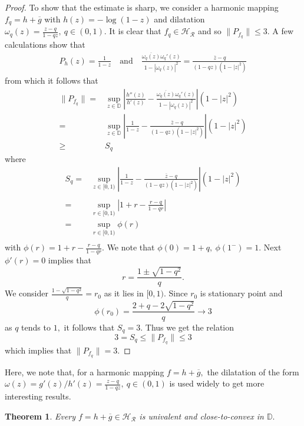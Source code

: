 \documentclass[a4paper,12pt]{amsart}
\newtheorem{thm}{Theorem}[section]
\theoremstyle{definition}
\begin{document}
\begin{proof}
		
		To show that the estimate is sharp, we consider a harmonic mapping $f_q=h+\overline{g}$ with $h(z)=-\log{(1-z)}$ and dilatation $\omega_q(z)=\frac{z-q}{1-qz},~q\in(0,1).$ It is clear that $f_q\in \mathcal{H_R}$ and so $\|P_{f_q}\|\le3.$ A few calculations show that 
		\begin{align}
			P_h(z)=\frac{1}{1-z}\quad\text{and}\quad \frac{\overline{\omega_q(z)}\omega_q'(z)}{1-|\omega_q(z)|^2}=\frac{\overline{z}-q}{(1-qz)(1-|z|^2)}
		\end{align}
		from which it follows that 
		\begin{align}
			\|P_{f_q}\|=&\sup_{z \in \mathbb{D}}\left|\frac{h''(z)}{h'(z)}-\frac{\overline{\omega_q(z)}\omega_q'(z)}{1-|\omega_q(z)|^2}\right|(1-|z|^2)\\\nonumber
			=&\sup_{z \in \mathbb{D}}\left|\frac{1}{1-z}-\frac{\overline{z}-q}{(1-qz)(1-|z|^2)}\right|(1-|z|^2)\\\nonumber
			\ge & S_q
		\end{align}
		where 
		\begin{align}
			S_q=&\sup_{z \in [0,1)}\left|\frac{1}{1-z}-\frac{\overline{z}-q}{(1-qz)(1-|z|^2)}\right|(1-|z|^2)\\\nonumber\\\nonumber
			=&\sup_{r \in [0,1)}\left|1+r-\frac{r-q}{1-qr}\right|\\\nonumber
			=&\sup_{r \in [0,1)}\phi(r)\\\nonumber
		\end{align}
		with $\phi(r)=1+r-\frac{r-q}{1-qr}.$ We note that $\phi(0)=1+q,~\phi(1^-)=1.$ Next $\phi'(r)=0$ implies that $$r=\frac{1\pm\sqrt{1-q^2}}{q}.$$ We consider $\frac{1-\sqrt{1-q^2}}{q}=r_0$ as it lies in $[0,1).$ Since $r_0$ is stationary point and $$\phi(r_0)=\frac{2+q-2\sqrt{1-q^2}}{q}\rightarrow 3$$ as $q$ tends to $1,$ it follows that $S_q=3.$ Thus we get the relation $$3=S_q\le \|P_{f_q}\|\le 3$$ which implies that $\|P_{f_q}\|=3.$
	\end{proof}
Here, we note that, for a harmonic mapping $f=h+\overline{g},$ the dilatation of the form  $\omega(z)=g'(z)/h'(z)=\frac{z-q}{1-qz},~q\in(0,1)$  is used widely to get more interesting results.
	\begin{thm}\label{P-171}
		Every $f=h+\overline{g}\in\mathcal{H_R}$ is univalent and close-to-convex in $\mathbb{D}.$
	\end{thm}
\end{document}
